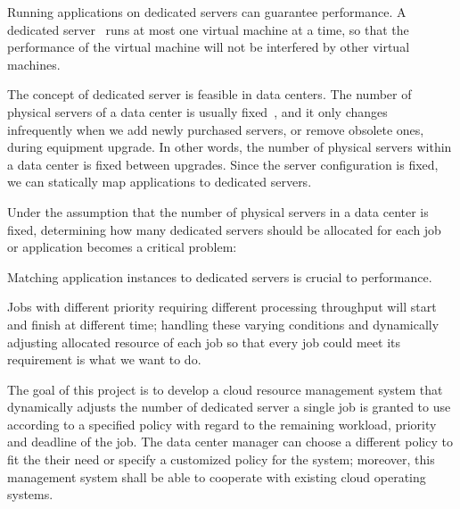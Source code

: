 Running applications on dedicated servers can guarantee performance.
A dedicated server~\cite{cite:dedicated_hosting} runs at most one
virtual machine at a time, so that the performance of the virtual
machine will not be interfered by other virtual machines.

The concept of dedicated server is feasible in data centers.
The number of physical servers of a data center is usually
fixed~\cite{cite:maintenance_framework}, and it only changes
infrequently when we add newly purchased servers, or remove obsolete
ones, during equipment upgrade.
In other words, the number of physical servers within a data center is
fixed between upgrades.
Since the server configuration is fixed, we can statically map
applications to dedicated servers.

Under the assumption that the number of physical servers in a data
center is fixed, determining how many dedicated servers should be
allocated for each job or application becomes a critical problem:

Matching application instances to dedicated servers is crucial to
performance.



Jobs with different priority requiring different processing throughput
will start and finish at different time; handling these varying
conditions and dynamically adjusting allocated resource of each job so
that every job could meet its requirement is what we want to do.

The goal of this project is to develop a cloud resource management
system that dynamically adjusts the number of dedicated server a single
job is granted to use according to a specified policy with regard to the
remaining workload, priority and deadline of the job.
The data center manager can choose a different policy to fit the their
need or specify a customized policy for the system; moreover, this
management system shall be able to cooperate with existing cloud
operating systems.

